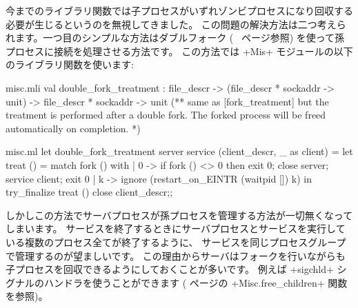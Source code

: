 今までのライブラリ関数では子プロセスがいずれゾンビプロセスになり回収する必要が生じるというのを無視してきました。
この問題の解決方法は二つ考えられます。一つ目のシンプルな方法はダブルフォーク (~\pageref{double-fork} ページ参照)
を使って孫プロセスに接続を処理させる方法です。
この方法では \ml+Mis+ モジュールの以下のライブラリ関数を使います:
%
\begin{codefile}{misc.mli}
val double_fork_treatment :
file_descr -> (file_descr * sockaddr -> unit) ->
file_descr * sockaddr -> unit
(** same as [fork_treatment] but the treatment is performed after a double
   fork. The forked process will be freed automatically on
   completion. *)
\end{codefile}
%
\begin{listingcodefile}{misc.ml}
let double_fork_treatment server service (client_descr, _ as client) =
  let treat () = match fork () with
    | 0 ->
        if fork () <> 0 then exit 0;
        close server; service client; exit 0
    | k ->
        ignore (restart_on_EINTR (waitpid []) k)
  in
  try_finalize treat () close client_descr;;
\end{listingcodefile}
%
しかしこの方法でサーバプロセスが孫プロセスを管理する方法が一切無くなってしまいます。
サービスを終了するときにサーバプロセスとサービスを実行している複数のプロセス全てが終了するように、
サービスを同じプロセスグループで管理するのが望ましいです。
この理由からサーバはフォークを行いながらも子プロセスを回収できるようにしておくことが多いです。
例えば \ml+sigchld+ シグナルのハンドラを使うことができます (\pageref{ex/childs} ページの
\ml+Misc.free_children+ 関数を参照)。

